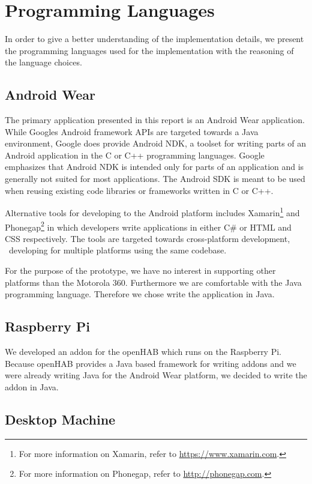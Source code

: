 \section{Programming Languages}
\label{sec:implementation:programming-language}

In order to give a better understanding of the implementation details, we present the programming languages used for the implementation with the reasoning of the language choices.

\subsection{Android Wear}

The primary application presented in this report is an Android Wear application. While Googles Android framework APIs are targeted towards a Java environment, Google does provide Android NDK, a toolset for writing parts of an Android application in the C or C++ programming languages. Google emphasizes that Android NDK is intended only for parts of an application and is generally not suited for most applications. The Android SDK is meant to be used when reusing existing code libraries or frameworks written in C or C++.

Alternative tools for developing to the Android platform includes Xamarin\footnote{For more information on Xamarin, refer to \url{https://www.xamarin.com}.} and Phonegap\footnote{For more information on Phonegap, refer to \url{http://phonegap.com}.} in which developers write applications in either C\# or HTML and CSS respectively. The tools are targeted towards cross-platform development, \ie~developing for multiple platforms using the same codebase.

For the purpose of the prototype, we have no interest in supporting other platforms than the Motorola 360. Furthermore we are comfortable with the Java programming language. Therefore we chose write the application in Java.

\subsection{Raspberry Pi}

We developed an addon for the openHAB which runs on the Raspberry Pi. Because openHAB provides a Java based framework for writing addons and we were already writing Java for the Android Wear platform, we decided to write the addon in Java.

\subsection{Desktop Machine}

